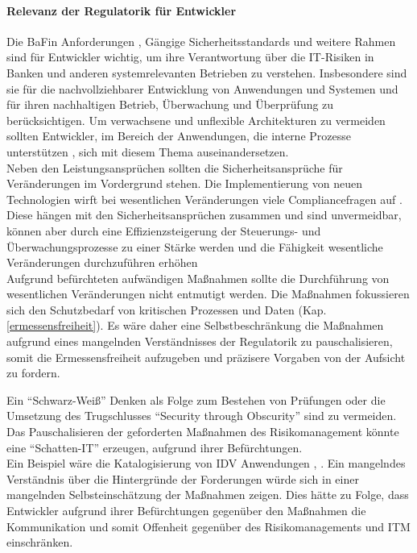 \paragraph{Relevanz der Regulatorik für Entwickler}
Die BaFin Anforderungen \cite{MaRisk:2017, BAIT:2018}, Gängige Sicherheitsstandards \cite{IT-Grundschutz:2020, Disterer2013} und weitere Rahmen sind für Entwickler wichtig, um ihre Verantwortung über die IT-Risiken in Banken und anderen systemrelevanten Betrieben zu verstehen. Insbesondere sind sie für die nachvollziehbarer Entwicklung von Anwendungen und Systemen und für ihren nachhaltigen Betrieb, Überwachung und Überprüfung zu berücksichtigen. Um verwachsene und unflexible Architekturen zu vermeiden sollten Entwickler, im Bereich der Anwendungen, die interne Prozesse unterstützen \cite{Bussmann2006}, sich mit diesem Thema auseinandersetzen.
\medskip
\\
Neben den Leistungsansprüchen sollten die Sicherheitsansprüche für Veränderungen im Vordergrund stehen. Die Implementierung von neuen Technologien wirft bei wesentlichen Veränderungen viele Compliancefragen auf \cite{MaRisk:2017}. Diese hängen mit den Sicherheitsansprüchen zusammen und sind unvermeidbar, können aber durch eine Effizienzsteigerung der Steuerungs- und Überwachungsprozesse zu einer Stärke werden und die Fähigkeit wesentliche Veränderungen durchzuführen erhöhen
\medskip
\\
Aufgrund befürchteten aufwändigen Maßnahmen sollte die Durchführung von wesentlichen Veränderungen nicht entmutigt werden. Die Maßnahmen fokussieren sich den Schutzbedarf von kritischen Prozessen und Daten (Kap. \ref{ermessensfreiheit}). Es wäre daher eine Selbstbeschränkung die Maßnahmen aufgrund eines mangelnden Verständnisses der Regulatorik zu pauschalisieren, somit die Ermessensfreiheit aufzugeben und präzisere Vorgaben von der Aufsicht zu fordern.

Ein \enquote{Schwarz-Weiß} Denken als Folge zum Bestehen von Prüfungen oder die Umsetzung des Trugschlusses \enquote{Security through Obscurity} sind zu vermeiden. Das Pauschalisieren der geforderten Maßnahmen des Risikomanagement könnte eine \enquote{Schatten-IT} \cite[S. 104]{Dorschel2018} erzeugen, aufgrund ihrer Befürchtungen. 
\medskip
\\
Ein Beispiel wäre die Katalogisierung von \ac{IDV} Anwendungen \cite{BAIT:2018}, \cite[Kap. 6.8]{Dorschel2018}. Ein mangelndes Verständnis über die Hintergründe der Forderungen würde sich in einer mangelnden Selbsteinschätzung der Maßnahmen zeigen. Dies hätte zu Folge, dass Entwickler aufgrund ihrer Befürchtungen gegenüber den Maßnahmen die Kommunikation und somit Offenheit gegenüber des Risikomanagements und \ac{ITM} einschränken.

